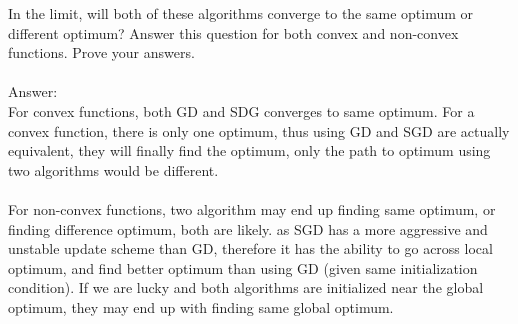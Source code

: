 \documentclass[11pt]{article}
\begin{document}
In the limit, will both of these algorithms converge to the same optimum or different optimum? Answer this question for both convex and non-convex functions. Prove your answers.\\\\
Answer: \\
For convex functions, both GD and SDG converges to same optimum. For a convex function, there is only one optimum, thus using GD and SGD are actually equivalent, they will finally find the optimum, only the path to optimum using two algorithms would be different.\\\\
For non-convex functions, two algorithm may end up finding same optimum, or finding difference optimum, both are likely. as SGD has a more aggressive and unstable update scheme than GD, therefore it has the ability to go across local optimum, and find better optimum than using GD (given same initialization condition). If we are lucky and both algorithms are initialized near the global optimum, they may end up with finding same global optimum.
\end{document}
